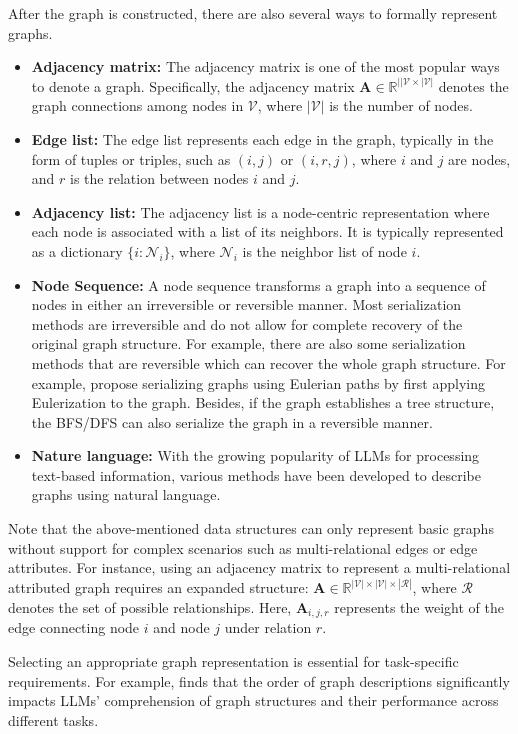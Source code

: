 After the graph is constructed, there are also several ways to formally represent graphs. 
\begin{itemize}[leftmargin=*]
    \item \textbf{Adjacency matrix:} The adjacency matrix is one of the most popular ways to denote a graph. Specifically, the adjacency matrix $\mathbf{A}\in\mathbb{R}^{||\mathcal{V}\times |\mathcal{V}|}$ denotes the graph connections among nodes in $\mathcal{V}$, where $|\mathcal{V}|$ is the number of nodes.

    
    \item \textbf{Edge list:} The edge list represents each edge in the graph, typically in the form of tuples or triples, such as $(i, j)$ or $(i, r, j)$, where $i$ and $j$ are nodes, and $r$ is the relation between nodes $i$ and $j$. 

    
    \item \textbf{Adjacency list:} The adjacency list is a node-centric representation where each node is associated with a list of its neighbors. It is typically represented as a dictionary $\{i: \mathcal{N}_i\}$, where $\mathcal{N}_i$ is the neighbor list of node $i$.
    
    \item \textbf{Node Sequence:} A node sequence transforms a graph into a sequence of nodes in either an irreversible or reversible manner. Most serialization methods are irreversible and do not allow for complete recovery of the original graph structure. For example, there are also some serialization methods that are reversible which can recover the whole graph structure. For example, \citet{zhao2023graphgpt} propose serializing graphs using Eulerian paths by first applying Eulerization to the graph. Besides, if the graph establishes a tree structure, the BFS/DFS can also serialize the graph in a reversible manner. 
    
    \item \textbf{Nature language:}  With the growing popularity of LLMs for processing text-based information, various methods have been developed to describe graphs using natural language.
\end{itemize}

Note that the above-mentioned data structures can only represent basic graphs without support for complex scenarios such as multi-relational edges or edge attributes. For instance, using an adjacency matrix to represent a multi-relational attributed graph requires an expanded structure: $\mathbf{A} \in \mathbb{R}^{|\mathcal{V}| \times |\mathcal{V}| \times |\mathcal{R}|}$, where $\mathcal{R}$ denotes the set of possible relationships. Here, $\mathbf{A}_{i,j,r}$ represents the weight of the edge connecting node $i$ and node $j$ under relation $r$. 

Selecting an appropriate graph representation is essential for task-specific requirements. For example, \citet{ge2024sequential} finds that the order of graph descriptions significantly impacts LLMs' comprehension of graph structures and their performance across different tasks.